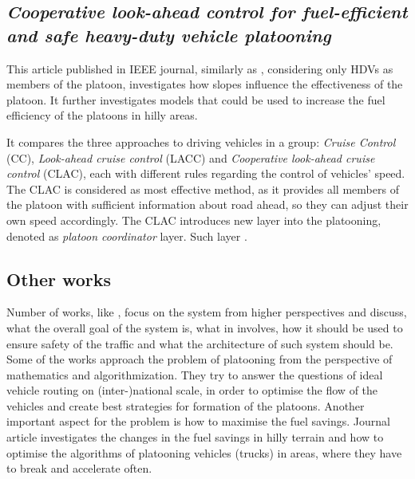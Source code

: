 \subsection{\textit{Cooperative look-ahead control for fuel-efficient and safe heavy-duty vehicle platooning}}
% 
This article \cite{Turri2016CooperativePlatooning} published in IEEE journal, similarly as \cite{Alam2014Fuel-efficientPlatooning}, considering only HDVs as members of the platoon, investigates how slopes influence the effectiveness of the platoon. It further investigates models that could be used to increase the fuel efficiency of the platoons in hilly areas.
\par
% 
It compares the three approaches to driving vehicles in a group: \emph{Cruise Control} (CC), \emph{Look-ahead cruise control} (LACC) and \emph{Cooperative look-ahead cruise control} (CLAC), each with different rules regarding the control of vehicles' speed. The CLAC is considered as most effective method, as it provides all members of the platoon with sufficient information about road ahead, so they can adjust their own speed accordingly. The CLAC introduces new layer into the platooning, denoted as \emph{platoon coordinator} layer. Such layer .
\par
% 
% 
% 
\subsection{Other works}
% 
Number of works, like \cite{Alvarez1997SafeSystems}, \cite{Nowakowski2015CooperativeAlternatives} focus on the system from higher perspectives and discuss, what the overall goal of the system is, what in involves, how it should be used to ensure safety of the traffic and what the architecture of such system should be. Some of the works \cite{Larsson2015TheHeuristics}
approach the problem of platooning from the perspective of mathematics and algorithmization. They try to answer the questions of ideal vehicle routing on (inter-)national scale, in order to optimise the flow of the vehicles and create best strategies for formation of the platoons.
Another important aspect for the problem is how to maximise the fuel savings. Journal article \cite{Turri2016CooperativePlatooning} investigates the changes in the fuel savings in hilly terrain and how to optimise the algorithms of platooning vehicles (trucks) in areas, where they have to break and accelerate often.\par
% 
